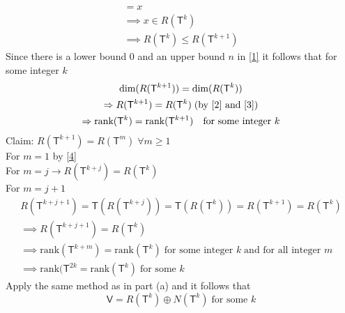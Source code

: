 \begin{enumerate}[(a)]
\begin{gather}
= x\\
\implies x \in R(\mathsf{T}^k)\\
\implies R(\mathsf{T}^k) \leq R(\mathsf{T}^{k+1}) \label{2}
\end{gather}
Since there is a lower bound 0 and an upper bound $n$ in \ref{1} it
follows that for some integer $k$
\begin{gather}
\text{dim}(R(\mathsf{T}^{k+1})) =
\text{dim}(R(\mathsf{T}^k)) \label{3}\\
\implies R(\mathsf{T}^{k+1}) = R(\mathsf{T}^k) \; (\text{by  \ref{2}
and \ref{3}}) \label{4}\\
\implies \text{rank}(\mathsf{T}^k) = \text{rank}(\mathsf{T}^{k+1})
\quad \text{for some integer } k
\end{gather}
Claim: $R\left(\mathsf{T}^{k+1}\right) = R(\mathsf{T}^m)\;\forall m \geq 1$
\\For $m=1$ by \ref{4}\\
For $m=j \rightarrow R(\mathsf{T}^{k+j}) = R(\mathsf{T}^k)$\\
For $m = j+1$
\begin{gather}
R\left(\mathsf{T}^{k+j+1}\right) =
\mathsf{T}\left(R\left(\mathsf{T}^{k+j}\right)\right) = 
\mathsf{T}\left(R\left(\mathsf{T}^k\right)\right) =
R\left(\mathsf{T}^{k+1}\right) = R\left(\mathsf{T}^k\right)\\
\implies R\left(\mathsf{T}^{k+j+1}\right) = R\left(\mathsf{T}^k\right)\\
\implies \text{rank}\left(\mathsf{T}^{k+m}\right) =\text{rank}\left(\mathsf{T}^k\right)\;
\text{for some integer } k\; \text{and for all integer } m\\
\implies \text{rank}(\mathsf{T}^{2k} = \text{rank}(\mathsf{T}^k) \;
\text{for some } k
\end{gather}
Apply the same method as in part (a) and it follows that
\begin{equation}
\mathsf{V} = R(\mathsf{T}^k)\oplus N(\mathsf{T}^k)\; \text{for some } k
\end{equation}
\end{enumerate}

